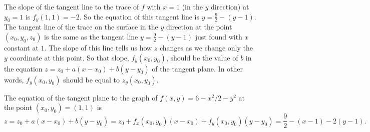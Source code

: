 \begin{activitySolution}
\item The slope of the tangent line to the trace of $f$ with $x=1$ (in the $y$ direction) at $y_0=1$ is $f_y(1,1) = -2$. So the equation of this tangent line is $y = \frac{9}{2} - (y-1)$. The tangent line of the trace on the surface in the $y$ direction at the point $(x_0,y_0,z_0)$ is the same as the tangent line $y = \frac{9}{2} - (y-1)$ just found with $x$ constant at $1$. The slope of this line tells us how $z$ changes as we change only the $y$ coordinate at this point. So that slope, $f_y(x_0,y_0)$, should be the value of $b$  in the equation $z = z_0+a(x-x_0) + b(y-y_0)$ of the tangent plane. In other words, $f_y(x_0,y_0)$ should be equal to $z_y(x_0,y_0)$. 

\item The equation of the tangent plane to the graph of $f(x,y)=6-x^2/2 - y^2$ at the point $(x_0,y_0)=(1,1)$ is
\[z=z_0 + a(x-x_0) + b(y-y_0) = z_0 + f_x(x_0,y_0)(x-x_0) + f_y(x_0,y_0)(y-y_0) = \frac{9}{2} - (x-1) - 2(y-1).\]

\ea
\end{activitySolution}

\aftera
